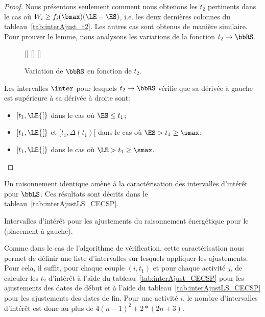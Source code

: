\begin{proof}
  Nous présentons seulement comment nous obtenons les $t_2$ pertinents
dans le cas où $W_i \ge f_i(\bmax)(\LE - \ES)$, i.e. les deux dernières
colonnes du tableau~\ref{tab:interAjust_t2}. Les autres cas sont
obtenus de manière similaire. Pour prouver le lemme, nous analysons
les variations de la fonction $t_2 \rightarrow \bbRS$.


\begin{figure}[!htb]
 [\linewidth] {
    }
 [\linewidth]{
  }
 [\linewidth]
{}
\caption{Variation de $\bbRS$ en fonction de $t_2$.}
\end{figure}


Les intervalles $\inter$ pour lesquels $t_2 \rightarrow \bbRS$ vérifie
que sa dérivée à gauche est supérieure à sa dérivée à droite sont:
\begin{itemize}
\item $[t_1, \LE {[}$ dans le cas où $\ES \le t_1 $;
\item $[t_1, \LE {[}$ et $[t_1, \Delta(t_1) [$ dans le cas où $\ES > t_1 \ge \smax$;
\item $[t_1, \LE {[}$ dans le cas où $\LE > t_1 \ge \smax $.
\end{itemize}

\end{proof}

Un raisonnement identique amène à la caractérisation des intervalles
d'intérêt pour $\bbLS$. Ces résultats sont décrits dans le
tableau~\ref{tab:interAjustLS_CECSP}.
  \begin{table} 
  
  \caption{Intervalles d'intérêt pour les ajustements du
    raisonnement énergétique pour le \CECSP (placement à gauche).}
  \label{tab:interAjustLS_CECSP}
\end{table}

Comme dans le cas de l'algorithme de vérification, cette
caractérisation nous permet de définir une liste d'intervalles sur
lesquels appliquer les ajustements. Pour cela, il suffit, pour chaque
couple $(i,t_1)$ et pour chaque activité $j$, de calculer les
$t_2$ d'intérêt à l'aide du tableau~\ref{tab:interAjust_CECSP} pour
les ajustements des dates de début et à l'aide du
tableau~\ref{tab:interAjustLS_CECSP} pour 
les ajustements des dates de fin. Pour une activité $i$, le nombre
d'intervalles d'intérêt est donc au plus de $4(n-1)^2 + 2* (2n+3)$.










